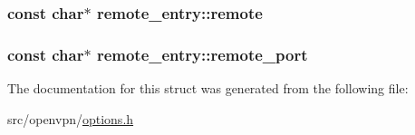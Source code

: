 \subsubsection[{remote}]{\setlength{\rightskip}{0pt plus 5cm}const char$\ast$ remote\+\_\+entry\+::remote}\label{structremote__entry_a4203205fd2cd785742e7eb57cd4d8d55}
\hypertarget{structremote__entry_a5be40d535585fa7721ad095b1ede3bc4}{}
\subsubsection[{remote\+\_\+port}]{\setlength{\rightskip}{0pt plus 5cm}const char$\ast$ remote\+\_\+entry\+::remote\+\_\+port}\label{structremote__entry_a5be40d535585fa7721ad095b1ede3bc4}


The documentation for this struct was generated from the following file\+:\begin{DoxyCompactItemize}
\item 
src/openvpn/\hyperlink{options_8h}{options.\+h}\end{DoxyCompactItemize}
